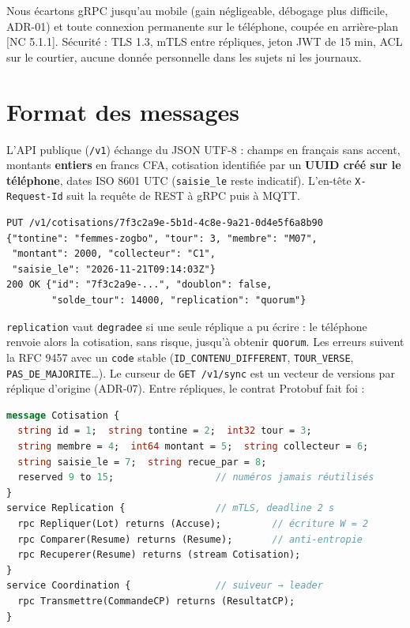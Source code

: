 \documentclass[12pt,a4paper]{article}
\begin{document}
Nous écartons gRPC jusqu'au mobile (gain négligeable, débogage plus difficile, ADR-01) et toute
connexion permanente sur le téléphone, coupée en arrière-plan [NC 5.1.1]. Sécurité : TLS 1.3,
mTLS entre répliques, jeton JWT de 15 min, ACL sur le courtier, aucune donnée personnelle dans
les sujets ni les journaux.

\section{Format des messages}
\label{sec:format}

L'API publique (\texttt{/v1}) échange du JSON UTF-8 : champs en français sans accent, montants
\textbf{entiers} en francs CFA, cotisation identifiée par un \textbf{UUID créé sur le téléphone},
dates ISO 8601 UTC (\texttt{saisie\_le} reste indicatif). L'en-tête \texttt{X-Request-Id} suit la
requête de REST à gRPC puis à MQTT.

\begin{lstlisting}[numbers=none, caption={Enregistrer une cotisation : requête puis réponse}, label={lst:rest}]
PUT /v1/cotisations/7f3c2a9e-5b1d-4c8e-9a21-0d4e5f6a8b90
{"tontine": "femmes-zogbo", "tour": 3, "membre": "M07",
 "montant": 2000, "collecteur": "C1",
 "saisie_le": "2026-11-21T09:14:03Z"}
200 OK {"id": "7f3c2a9e-...", "doublon": false,
        "solde_tour": 14000, "replication": "quorum"}
\end{lstlisting}

\texttt{replication} vaut \texttt{degradee} si une seule réplique a pu écrire : le téléphone
renvoie alors la cotisation, sans risque, jusqu'à obtenir \texttt{quorum}. Les erreurs suivent la
RFC 9457 avec un \texttt{code} stable (\texttt{ID\_CONTENU\_DIFFERENT}, \texttt{TOUR\_VERSE},
\texttt{PAS\_DE\_MAJORITE}\ldots). Le curseur de \texttt{GET /v1/sync} est un vecteur de
versions par réplique d'origine (ADR-07). Entre répliques, le contrat Protobuf fait foi :

\begin{lstlisting}[language=Protobuf, caption={Extrait du contrat \texttt{proto/tontinet/v1/}}, label={lst:proto}]
message Cotisation {
  string id = 1;  string tontine = 2;  int32 tour = 3;
  string membre = 4;  int64 montant = 5;  string collecteur = 6;
  string saisie_le = 7;  string recue_par = 8;
  reserved 9 to 15;                  // numéros jamais réutilisés
}
service Replication {                // mTLS, deadline 2 s
  rpc Repliquer(Lot) returns (Accuse);         // écriture W = 2
  rpc Comparer(Resume) returns (Resume);       // anti-entropie
  rpc Recuperer(Resume) returns (stream Cotisation);
}
service Coordination {               // suiveur → leader
  rpc Transmettre(CommandeCP) returns (ResultatCP);
}
\end{lstlisting}
\end{document}

